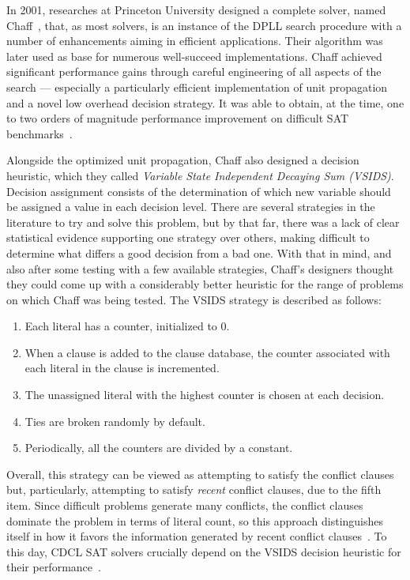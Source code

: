 In 2001, researches at Princeton University designed a complete solver, named
Chaff~\cite{moskewicz2001chaff}, that, as most solvers, is an instance of the
DPLL search procedure with a number of enhancements aiming in efficient applications.
Their algorithm was later used as base for numerous well-succeed
implementations. Chaff achieved significant performance gains through careful
engineering of all aspects of the search --- especially a particularly efficient
implementation of unit propagation and a novel low overhead decision strategy.
It was able to obtain, at the time, one to two orders of magnitude performance
improvement on difficult SAT benchmarks~\cite{moskewicz2001chaff}.

Alongside the optimized unit propagation, Chaff also designed a decision
heuristic, which they called \emph{Variable State Independent Decaying Sum
(VSIDS)}. Decision assignment consists of the determination of which new
variable should be assigned a value in each decision level. There are several
strategies in the literature to try and solve this problem, but by that far,
there was a lack of clear statistical evidence supporting one strategy over
others, making difficult to determine what differs a good decision from a bad
one. With that in mind, and also after some testing with a few available
strategies, Chaff's designers thought they could come up with a considerably
better heuristic for the range of problems on which Chaff was being tested. The
VSIDS strategy is described as follows:

\begin{enumerate}
    \item Each literal has a counter, initialized to 0.
    \item When a clause is added to the clause database, the counter associated with
        each literal in the clause is incremented.
    \item The unassigned literal with the highest counter is chosen at each
        decision.
    \item Ties are broken randomly by default.
    \item Periodically, all the counters are divided by a constant.
\end{enumerate}

Overall, this strategy can be viewed as attempting to satisfy the conflict
clauses but, particularly, attempting to satisfy \emph{recent} conflict clauses,
due to the fifth item. Since difficult problems generate many conflicts, the
conflict clauses dominate the problem in terms of literal count, so this
approach distinguishes itself in how it favors the information generated by
recent conflict clauses~\cite{moskewicz2001chaff}. To this day, CDCL SAT solvers
crucially depend on the VSIDS decision heuristic for their
performance~\cite{vsidsincdcl}. 

